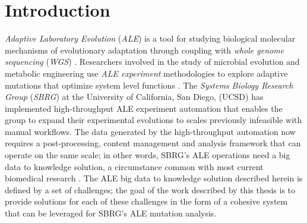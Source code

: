 \documentclass[12pt,final,masters,chapterheads]{ucsd}  %
\begin{document}
%





%   
%   
%
\chapter{Introduction}
%
%
%
%
\textit{Adaptive Laboratory Evolution} (\textit{ALE}) is a tool for studying biological molecular mechanisms of evolutionary adaptation through coupling with \textit{whole genome sequencing} (\textit{WGS}) \cite{Conrad2011}. Researchers involved in the study of microbial evolution and metabolic engineering use \textit{ALE experiment} methodologies to explore adaptive mutations that optimize system level functions \cite{ASM:/content/journal/microbe/10.1128/microbe.6.69.1}. The \textit{Systems Biology Research Group} (\textit{SBRG}) at the University of  California, San Diego, (UCSD) has implemented high-throughput ALE experiment automation that enables the group to expand their experimental evolutions to scales previously infeasible with manual workflows. The data generated by the high-throughput automation now requires a post-processing, content management and analysis framework that can operate on the same scale; in other words, SBRG's ALE operations need a big data to knowledge solution, a circumstance common with most current biomedical research \cite{Margolis957}. The ALE big data to knowledge solution described herein is defined by a set of challenges; the goal of the work described by this thesis is to provide solutions for each of these challenges in the form of a cohesive system that can be leveraged for SBRG's ALE mutation analysis.
\end{document}
